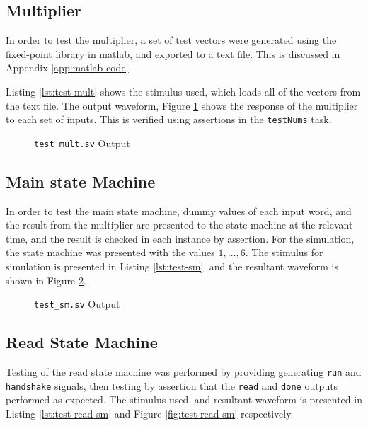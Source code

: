 \FloatBarrier
\subsection{Multiplier} \label{sec:test-mult}
In order to test the multiplier, a set of test vectors were generated using the fixed-point library in \gls{matlab}, and exported to a text file. This is discussed in Appendix \ref{app:matlab-code}.

Listing \ref{lst:test-mult} shows the stimulus used, which loads all of the vectors from the text file. The output waveform, Figure \ref{fig:test-mult} shows the response of the multiplier to each set of inputs. This is verified using assertions in the \texttt{testNums} task.


\begin{figure}[ht]
	\centering
	
	\caption{\texttt{test\_mult.sv} Output}
	\label{fig:test-mult}
\end{figure}

\FloatBarrier
\subsection{Main state Machine}
In order to test the main state machine, dummy values of each input word, and the result from the multiplier are presented to the state machine at the relevant time, and the result is checked in each instance by assertion. For the simulation, the state machine was presented with the values $1,\dots,6$. The stimulus for simulation is presented in Listing \ref{lst:test-sm}, and the resultant waveform is shown in Figure \ref{fig:test-sm}.


\begin{figure}[ht]
	\centering
	
	\caption{\texttt{test\_sm.sv} Output}
	\label{fig:test-sm}
\end{figure}

\FloatBarrier
\subsection{Read State Machine}
Testing of the read state machine was performed by providing generating \texttt{run} and \texttt{handshake} signals, then testing by assertion that the \texttt{read} and \texttt{done} outputs performed as expected. The stimulus used, and resultant waveform is presented in Listing \ref{lst:test-read-sm} and Figure \ref{fig:test-read-sm} respectively.


